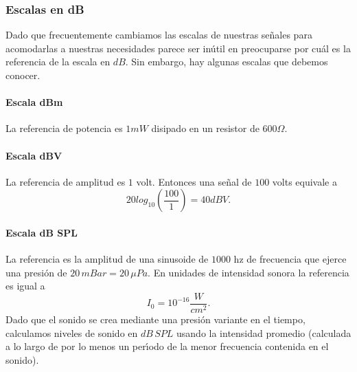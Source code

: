 \subsubsection{Escalas en dB}

Dado que frecuentemente cambiamos las escalas de nuestras se\~{n}ales
para acomodarlas a nuestras necesidades parece ser in\'{u}til en
preocuparse por cu\'{a}l es la referencia de la escala en $dB$.  Sin
embargo, hay algunas escalas que debemos conocer.

\paragraph{Escala dBm} 
La referencia de potencia es $1 mW$ disipado en un
resistor de $600 \Omega$.

\paragraph{Escala dBV} 
La referencia de amplitud es $1$ volt. Entonces una se\~{n}al de $100$
volts equivale a
\begin{equation}
  20 log_{10} (\frac{100}{1}) = 40 dBV.
\end{equation}

\paragraph{Escala dB SPL} 
La referencia es la amplitud de una sinusoide de $1000$ hz de
frecuencia que ejerce una presi\'{o}n de $20 \, mBar = 20 \, \mu Pa$.
En unidades de intensidad sonora la referencia es igual a
\begin{equation}
  I_{0} = 10^{-16} \frac{W}{cm^{2}}.
\end{equation}
Dado que el sonido se crea mediante una presi\'{o}n variante en el
tiempo, calculamos niveles de sonido en $dB \, SPL$ usando la intensidad
promedio (calculada a lo largo de por lo menos un per\'{\i}odo de la
menor frecuencia contenida en el sonido).

